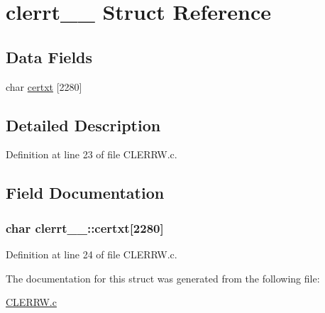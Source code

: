 \hypertarget{structclerrt__1__}{}\section{clerrt\+\_\+\_\+ Struct Reference}
\label{structclerrt__1__}
\subsection*{Data Fields}
\begin{DoxyCompactItemize}
\item 
char \hyperlink{structclerrt__1___a249515c5d7aee573d7a2f9f4b0f9652f}{certxt} \mbox{[}2280\mbox{]}
\end{DoxyCompactItemize}


\subsection{Detailed Description}


Definition at line 23 of file C\+L\+E\+R\+R\+W.\+c.



\subsection{Field Documentation}
\subsubsection[{\texorpdfstring{certxt}{certxt}}]{\setlength{\rightskip}{0pt plus 5cm}char clerrt\+\_\+\_\+\+::certxt\mbox{[}2280\mbox{]}}\hypertarget{structclerrt__1___a249515c5d7aee573d7a2f9f4b0f9652f}{}\label{structclerrt__1___a249515c5d7aee573d7a2f9f4b0f9652f}


Definition at line 24 of file C\+L\+E\+R\+R\+W.\+c.



The documentation for this struct was generated from the following file\+:\begin{DoxyCompactItemize}
\item 
\hyperlink{CLERRW_8c}{C\+L\+E\+R\+R\+W.\+c}\end{DoxyCompactItemize}
